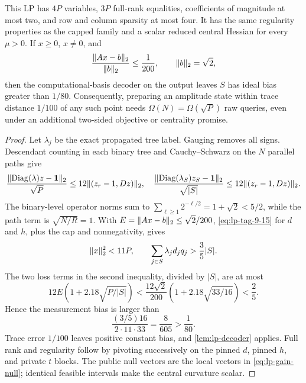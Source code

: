 \begin{theorem}
\label{thm:lp-parallel-path}
This LP has \(4P\) variables, \(3P\) full-rank equalities, coefficients of
magnitude at most two, and row and column sparsity at most four.  It has the
same regularity properties as the capped family and a scalar reduced central
Hessian for every \(\mu>0\).  If \(x\geq0\), \(x\ne0\), and
\begin{equation}
 \frac{\lVert Ax-b\rVert_2}{\lVert b\rVert_2}\leq\frac1{200},
 \qquad \lVert b\rVert_2=\sqrt2,
\end{equation}
then the computational-basis decoder on the output leaves \(S\) has ideal
bias greater than \(1/80\).
Consequently, preparing an amplitude state within trace distance \(1/100\)
of any such point needs \(\Omega(N)=\Omega(\sqrt P)\) raw queries, even
under an additional two-sided objective or centrality promise.
\end{theorem}

\begin{proof}
Let \(\lambda_j\) be the exact propagated tree label.  Gauging removes all signs.
Descendant counting in each binary tree and Cauchy--Schwarz on the \(N\)
parallel paths give
\begin{equation}
 \frac{\lVert\operatorname{Diag}(\lambda)z-\mathbf1\rVert_2}{\sqrt P}
 \leq12\lVert(z_r-1,Dz)\rVert_2,
\quad
 \frac{\lVert\operatorname{Diag}(\lambda_S)z_S-\mathbf1\rVert_2}{\sqrt{|S|}}
 \leq12\lVert(z_r-1,Dz)\rVert_2.
\label{eq:lp-tag-9-15}
\end{equation}
The binary-level operator norms sum to
\(\sum_{\ell\geq1}2^{-\ell/2}=1+\sqrt2<5/2\), while the path term is
\(\sqrt{N/R}=1\).  With \(E=\lVert Ax-b\rVert_2\leq\sqrt2/200\),
\eqref{eq:lp-tag-9-15} for
\(d\) and \(h\), plus the cap and nonnegativity, gives
\begin{equation}
 \lVert x\rVert_2^2<11P,
 \qquad
 \sum_{j\in S}\lambda_jd_jq_j>\frac35|S|.
\end{equation}
The two loss terms in the second inequality, divided by \(|S|\), are at most
\[
 12E\left(1+2.18\sqrt{P/|S|}\right)
 <\frac{12\sqrt2}{200}\left(1+2.18\sqrt{33/16}\right)<\frac25.
\]
Hence the measurement bias is larger than
\[
 \frac{(3/5)16}{2\cdot11\cdot33}=\frac8{605}>\frac1{80}.
\]
Trace error \(1/100\) leaves positive constant bias, and
\cref{lem:lp-decoder} applies.  Full rank and regularity follow by
pivoting successively on the pinned \(d\), pinned \(h\), and private
\(t\) blocks.  The public null vectors are the local vectors in
\eqref{eq:lp-gain-null}; identical feasible intervals make the central
curvature scalar.
\end{proof}

